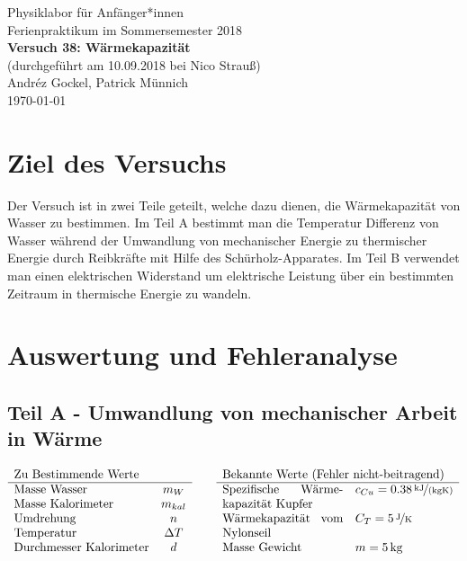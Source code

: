\documentclass[11pt,a4paper]{article}
\begin{document}
{
\centering 
\large 
Physiklabor für Anf\"anger*innen \\
Ferienpraktikum im Sommersemester 2018 \\[4mm]
\textbf{\LARGE 
Versuch 38: Wärmekapazität
} \\[3mm]
(durchgef\"uhrt am 10.09.2018 bei Nico Strauß) \\
Andréz Gockel, Patrick M\"unnich\\
\today \\[10mm]
}

\section{Ziel des Versuchs}

Der Versuch ist in zwei Teile geteilt, welche dazu dienen, die Wärmekapazität von Wasser zu bestimmen. Im Teil A bestimmt man die Temperatur Differenz von Wasser während der Umwandlung von mechanischer Energie zu thermischer Energie durch Reibkräfte mit Hilfe des Schürholz-Apparates. Im Teil B verwendet man einen elektrischen Widerstand um elektrische Leistung über ein bestimmten Zeitraum in thermische Energie zu wandeln.

\section{Auswertung und Fehleranalyse}

\subsection{Teil A - Umwandlung von mechanischer Arbeit in Wärme }
$$
\begin{array}{lc}
	\multicolumn{1}{l}{\textrm{Zu Bestimmende Werte}} \\
	\hline
	\textrm{Masse Wasser} & m_W \\
	\textrm{Masse Kalorimeter} & m_{kal} \\
	\textrm{Umdrehung} & n \\
	\textrm{Temperatur} & \Delta T\\
	\textrm{Durchmesser Kalorimeter} & d\\
\end{array}
\qquad
\begin{array}{p{3.5cm}l c}
	\multicolumn{2}{l}{\textrm{Bekannte Werte (Fehler nicht-beitragend)}} \\
	\hline
	\textrm{Spezifische Wärme\-kapazität Kupfer} & c_{Cu} = 0.38\, \nicefrac{\textrm{kJ}}{\textrm{(kgK)}} \\
	\textrm{Wärmekapazität vom Nylonseil} & C_T = 5\, \nicefrac{\textrm{J}}{\textrm{K}} \\
	\textrm{Masse Gewicht} & m = 5\, \textrm{kg} \\
\end{array}
$$
\end{document}
